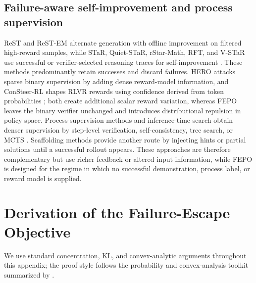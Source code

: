 \documentclass{article}
\newcommand{\FEPO}{\textsc{FEPO}\xspace}
\begin{document}
\subsection{Failure-aware self-improvement and process supervision}
ReST and ReST-EM alternate generation with offline improvement on filtered high-reward samples, while STaR, Quiet-STaR, rStar-Math, RFT, and V-STaR use successful or verifier-selected reasoning traces for self-improvement \citep{gulcehre2023rest,dong2023restem,zelikman2022star,zelikman2024quietst,guan2025rstar,yuan2023rft,hosseini2024vstar}. These methods predominantly retain successes and discard failures. HERO attacks sparse binary supervision by adding dense reward-model information, and ConSteer-RL shapes RLVR rewards using confidence derived from token probabilities \citep{tao2025hero,miao2026consteer}; both create additional scalar reward variation, whereas \FEPO leaves the binary verifier unchanged and introduces distributional repulsion in policy space. Process-supervision methods and inference-time search obtain denser supervision by step-level verification, self-consistency, tree search, or MCTS \citep{lightman2023letsverify,wang2024mathshepherd,wang2023selfconsistency,yao2023tot}. Scaffolding methods provide another route by injecting hints or partial solutions until a successful rollout appears. These approaches are therefore complementary but use richer feedback or altered input information, while \FEPO is designed for the regime in which no successful demonstration, process label, or reward model is supplied.


\renewcommand{\thetable}{\Alph{section}.\arabic{table}}
\renewcommand{\thefigure}{\Alph{section}.\arabic{figure}}
\renewcommand{\theequation}{\Alph{section}.\arabic{equation}}
\renewcommand{\theHtable}{appendix.\Alph{section}.\arabic{table}}
\renewcommand{\theHfigure}{appendix.\Alph{section}.\arabic{figure}}
\renewcommand{\theHequation}{appendix.\Alph{section}.\arabic{equation}}
\section{Derivation of the Failure-Escape Objective}
\label{app:derivation}
We use standard concentration, KL, and convex-analytic arguments throughout this appendix; the proof style follows the probability and convex-analysis toolkit summarized by \citet{lattimore2020bandit}.
\end{document}

